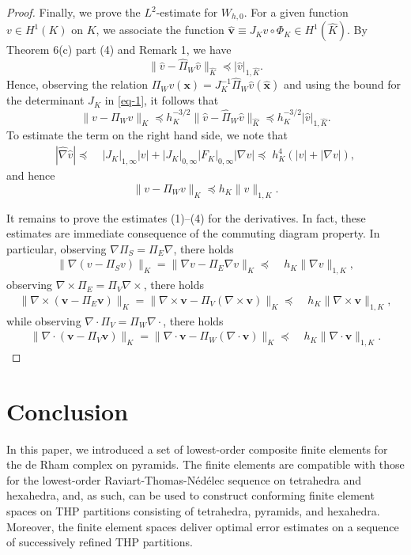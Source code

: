 \documentclass[twoside,reqno,final]{amsart}
\renewcommand{\b}[1]{{\boldsymbol{#1}}}
\newcommand{\NED}{N\'ed\'elec }
\newcommand{\curls}{{{\nabla\times}}}
\newcommand{\divs}{{\nabla\cdot}}
\newcommand{\grads}{{\nabla}}
\newcommand{\pol}{\mathbb{P}}
\begin{document}
\begin{proof}
Finally, we  prove the $L^2$-estimate for $W_{h,0}$.
For a given function $ v\in H^1(K)$ on $K$, we associate the function 
 $\widehat{\b v}\equiv J_K v\circ \Phi_K \in H^1(\widehat K)$. 
By Theorem 6(c) part (4) and Remark 1, we have
\[
 \|\widehat {v}-\widehat { \varPi}_W\widehat{  v}\|_{\widehat K}\preceq 
  |\widehat{ v}|_{1, \widehat K}.
\]
 Hence, observing the relation $\varPi_W  v(\b x) = J_K^{-1}\widehat { \varPi}_W \widehat{ v}(\widehat{\b x})$ and using the bound 
for the determinant $J_K$ in \eqref{eq-1}, it follows that 
\[
\|v- \varPi_W v\|_{K}\preceq h_K^{-3/2} 
\|\widehat{v}- \widehat{ \varPi}_W\widehat{ v}\|_{\widehat K}\preceq h_K^{-3/2} 
|\widehat{ v}|_{1, \widehat K}. 
\]
To estimate the term on the right hand side, we note that 
\begin{align*}
  |\widehat{\nabla}\widehat{ v}|   \preceq&\; 
  |J_K|_{1,\infty} | v|+|J_K|_{0,\infty}|F_K|_{0,\infty} |\grads  v|
  \preceq \;h_K^4(|  v|+|\nabla v|),
\end{align*}
and hence
\[
\|v- \varPi_W v\|_{K}\preceq
h_K\|v\|_{1,K}.
\]


It remains to prove the estimates (1)--(4) for the derivatives.
In fact, these estimates are immediate consequence of 
the commuting diagram property. In particular, 
observing $\grads \varPi_S = \varPi_E \grads$, there holds
\begin{align*}
 \|
 \grads (v-\varPi_S v)
 \|_K = 
\|  \grads v-\b \varPi_E \grads v
 \|_K
 \preceq &\;h_K \|\grads v\|_{1,K},
\end{align*}
observing $\curls \b\varPi_E =\b \varPi_V \curls$, there holds
\begin{align*}
 \|
 \curls (\b v-\b\varPi_E\b v)
 \|_K = 
\|  \curls\b v-\b \varPi_V (\curls\b v)
 \|_K
 \preceq &\;h_K \|\curls \b v\|_{1,K},
\end{align*}
while
observing $\divs \b\varPi_V =\varPi_W \divs$, there holds
\begin{align*}
 \|
 \divs (\b v-\b\varPi_V\b v)
 \|_K = 
\|  \divs\b v-\varPi_W (\divs\b v)
 \|_K
 \preceq &\;h_K \|\divs \b v\|_{1,K}.
\end{align*}
\end{proof}


\section{Conclusion}
In this paper, we introduced a set of lowest-order composite finite elements for the de Rham complex on  pyramids.
The finite elements are compatible 
with those for the lowest-order {Raviart-Thomas-\NED}sequence on tetrahedra and hexahedra,
and, as such, can be used to construct conforming 
finite element spaces on {\sf THP} partitions consisting of tetrahedra, pyramids, and hexahedra.
Moreover, the finite element spaces deliver optimal error estimates on a sequence of successively refined {\sf THP}
partitions.
\end{document}

